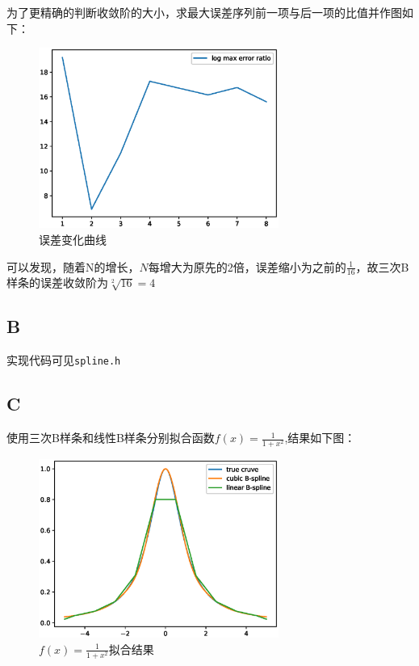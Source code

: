 \documentclass[12]{article}%
\begin{document}
        为了更精确的判断收敛阶的大小，求最大误差序列前一项与后一项的比值并作图如下：
        \begin{figure}[H]
            \centering
            \includegraphics[width=0.7\textwidth]{../pic/A3.eps}
            \caption{误差变化曲线}
        \end{figure}

        可以发现，随着N的增长，$N$每增大为原先的2倍，误差缩小为之前的$\frac{1}{16}$，故三次B样条的误差收敛阶为$\sqrt[2]{16}=4$
    \subsection{B}
        实现代码可见\verb|spline.h|
    \subsection{C}
        使用三次B样条和线性B样条分别拟合函数$f(x)=\frac{1}{1+x^2}$,结果如下图：
        \begin{figure}[H]
            \centering
            \includegraphics[width=0.7\textwidth]{../pic/C.eps}
            \caption{$f(x)=\frac{1}{1+x^2}$拟合结果}
        \end{figure}
\end{document}
